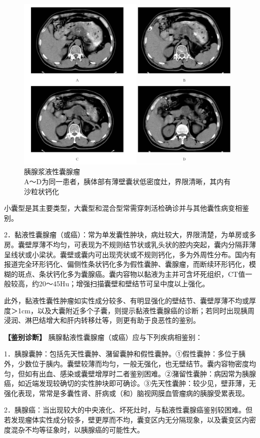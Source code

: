 \begin{figure}[!htbp]
 \centering
 \includegraphics[width=.7\textwidth,height=\textheight,keepaspectratio]{./images/Image00306.jpg}
 \captionsetup{justification=centering}
 \caption{胰腺浆液性囊腺瘤\\{\small A～D为同一患者，胰体部有薄壁囊状低密度灶，界限清晰，其内有沙粒状钙化}}
 \label{fig13-5}
  \end{figure} 

小囊型是其主要类型，大囊型和混合型常需穿刺活检确诊并与其他囊性病变相鉴别。

2．黏液性囊腺瘤（或癌）：常为单发囊性肿块，病灶较大，界限清楚，为单房或多房。囊壁厚薄不均匀，可表现为不规则结节状或乳头状的腔内突起，囊内分隔菲薄呈线状或小梁状。囊壁或囊内可出现壳状或不规则钙化，多为外周性分布。国内有报道完全环形钙化、偏侧性条状钙化多为假性囊肿、囊腺瘤，而断续环形钙化，模糊的斑点、条状钙化多为囊腺癌。囊内容物以黏液为主并可含坏死组织，CT值一般较高，约20～45Hu；增强扫描囊壁和壁结节可呈中度以上强化。

此外，黏液性囊性肿瘤如实性成分较多、有明显强化的壁结节、囊壁厚薄不均或厚度＞1cm，以及大囊附近多个子囊，则提示黏液性囊腺癌的诊断；若同时出现胰周浸润、淋巴结增大和肝内转移灶等，则更有助于良恶性的鉴别。

\textbf{【鉴别诊断】} 胰腺黏液性囊腺瘤（或癌）应与下列疾病相鉴别：

1．胰腺囊肿：包括先天性囊肿、潴留囊肿和假性囊肿。①假性囊肿：多位于胰外，少数位于胰内。囊壁较薄而均匀，一般无强化，也无壁结节。囊内容物密度均匀，但如有出血、感染或囊壁增厚时二者鉴别困难。②潴留性囊肿：病因常为胰腺癌，如近端发现较确切的实性肿块即可确诊。③先天性囊肿：较少见，壁菲薄，无强化表现，常常是多囊性肾、肝病或（和）脑视网膜血管瘤病的胰腺受累表现。

2．胰腺癌：当出现较大的中央液化、坏死灶时，与黏液性囊腺癌鉴别较困难。但若发现瘤体实性成分较多，壁更厚而不均，囊变区内无分隔现象，以及囊变区内密度混杂不均等征象时，以胰腺癌的可能性大。

